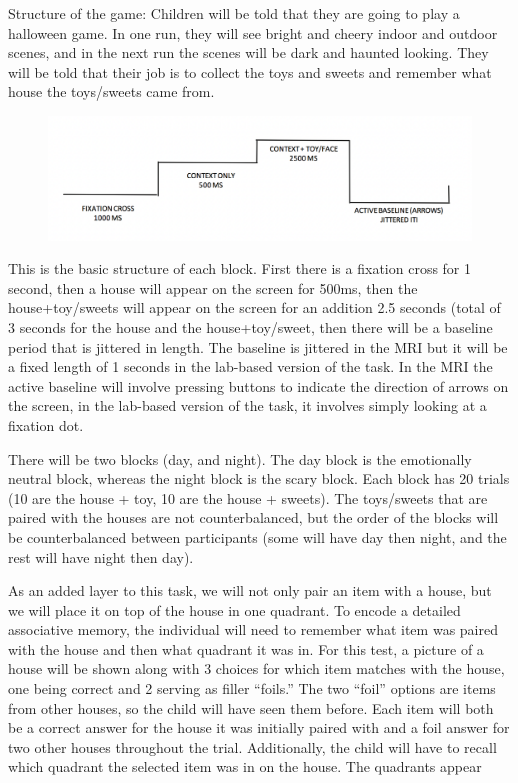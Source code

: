\documentclass[]{book}
\begin{document}
Structure of the game:
Children will be told that they are going to play a halloween game. In one run, they will see bright and cheery indoor and outdoor scenes, and in the next run the scenes will be dark and haunted looking. They will be told that their job is to collect the toys and sweets and remember what house the toys/sweets came from.

\begin{figure}
\centering
\includegraphics{images/information/measures/tasks/halloween/1.png}
\caption{}
\end{figure}

This is the basic structure of each block. First there is a fixation cross for 1 second, then a house will appear on the screen for 500ms, then the house+toy/sweets will appear on the screen for an addition 2.5 seconds (total of 3 seconds for the house and the house+toy/sweet, then there will be a baseline period that is jittered in length. The baseline is jittered in the MRI but it will be a fixed length of 1 seconds in the lab-based version of the task. In the MRI the active baseline will involve pressing buttons to indicate the direction of arrows on the screen, in the lab-based version of the task, it involves simply looking at a fixation dot.

There will be two blocks (day, and night). The day block is the emotionally neutral block, whereas the night block is the scary block. Each block has 20 trials (10 are the house + toy, 10 are the house + sweets). The toys/sweets that are paired with the houses are not counterbalanced, but the order of the blocks will be counterbalanced between participants (some will have day then night, and the rest will have night then day).

As an added layer to this task, we will not only pair an item with a house, but we will place it on top of the house in one quadrant. To encode a detailed associative memory, the individual will need to remember what item was paired with the house and then what quadrant it was in. For this test, a picture of a house will be shown along with 3 choices for which item matches with the house, one being correct and 2 serving as filler ``foils.'' The two ``foil'' options are items from other houses, so the child will have seen them before. Each item will both be a correct answer for the house it was initially paired with and a foil answer for two other houses throughout the trial. Additionally, the child will have to recall which quadrant the selected item was in on the house. The quadrants appear
\end{document}
